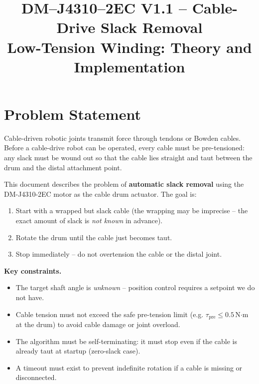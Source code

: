 \documentclass[11pt,a4paper]{article}
\title{DM--J4310--2EC V1.1 -- Cable-Drive Slack Removal\\
\large Low-Tension Winding: Theory and Implementation}
\author{}
\date{}
\begin{document}
\maketitle
\tableofcontents
\vspace{1em}

\section{Problem Statement}
\label{sec:problem}

Cable-driven robotic joints transmit force through tendons or Bowden cables.
Before a cable-drive robot can be operated, every cable must be pre-tensioned:
any slack must be wound out so that the cable lies straight and taut between
the drum and the distal attachment point.

This document describes the problem of \textbf{automatic slack removal} using
the DM-J4310-2EC motor as the cable drum actuator.  The goal is:

\begin{enumerate}
  \item Start with a wrapped but slack cable (the wrapping may be imprecise --
        the exact amount of slack is \emph{not known} in advance).
  \item Rotate the drum until the cable just becomes taut.
  \item Stop immediately -- do not overtension the cable or the distal joint.
\end{enumerate}

\noindent\textbf{Key constraints.}

\begin{itemize}
  \item The target shaft angle is \emph{unknown} -- position control requires
        a setpoint we do not have.
  \item Cable tension must not exceed the safe pre-tension limit (e.g.
        $\tau_\text{pre} \leq 0.5$\,N$\cdot$m at the drum) to avoid
        cable damage or joint overload.
  \item The algorithm must be self-terminating: it must stop even if the cable
        is already taut at startup (zero-slack case).
  \item A timeout must exist to prevent indefinite rotation if a cable is
        missing or disconnected.
\end{itemize}
\end{document}
